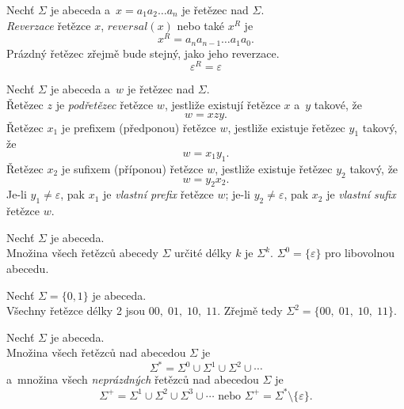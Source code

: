 \begin{definition}
    Nechť $\Sigma$ je abeceda a~$x = a_1a_2\ldots a_n$ je řetězec nad $\Sigma$.\\
    \emph{Reverzace} řetězce $x$, $reversal(x)$ nebo také $x^R$ je
    \begin{equation*}
        x^R = a_na_{n-1}\ldots a_1a_0.
    \end{equation*} 
    Prázdný řetězec zřejmě bude stejný, jako jeho reverzace.
    \begin{equation*}
        \varepsilon^R = \varepsilon
    \end{equation*}
\end{definition}

\begin{definition}
    Nechť $\Sigma$ je abeceda a~$w$ je řetězec nad $\Sigma$.\\
    Řetězec $z$ je \emph{podřetězec} řetězce $w$, jestliže existují řetězce $x$ a~$y$ takové, že
    \begin{equation*}
        w = xzy.
    \end{equation*}
    Řetězec $x_1$ je prefixem (předponou) řetězce $w$, jestliže existuje řetězec $y_1$ takový, že
    \begin{equation*}
        w = x_1y_1.
    \end{equation*}
    Řetězec $x_2$ je sufixem (příponou) řetězce $w$, jestliže existuje řetězec $y_2$ takový, že
    \begin{equation*}
        w = y_2x_2.
    \end{equation*}
    Je-li $y_1 \neq \varepsilon$, pak $x_1$ je \emph{vlastní prefix} řetězce $w$; je-li $y_2 \neq \varepsilon$, pak $x_2$ je \emph{vlastní sufix} řetězce $w$.
\end{definition}

\begin{definition}
    Nechť $\Sigma$ je abeceda.\\
    Množina všech řetězců abecedy $\Sigma$ určité délky $k$ je $\Sigma^k$.
    $\Sigma^0 = \{\varepsilon\}$ pro libovolnou abecedu.
\end{definition}

\begin{example}
    Nechť $\Sigma = \{0, 1\}$ je abeceda.\\
    Všechny řetězce délky 2 jsou $00,\; 01,\; 10,\; 11$.
    Zřejmě tedy $\Sigma^2 = \{00,\; 01,\; 10,\; 11\}$.
\end{example}

\begin{definition}
    Nechť $\Sigma$ je abeceda.\\
    Množina všech řetězců nad abecedou $\Sigma$ je
    \begin{equation*}
        \Sigma^* = \Sigma^0 \cup \Sigma^1 \cup \Sigma^2 \cup \cdots
    \end{equation*}
    a~množina všech \emph{neprázdných} řetězců nad abecedou $\Sigma$ je
    \begin{equation*}
        \Sigma^+ = \Sigma^1 \cup \Sigma^2 \cup \Sigma^3 \cup \cdots \text{ nebo } \Sigma^+ = \Sigma^* \setminus \{\varepsilon\}.
    \end{equation*}
\end{definition}

